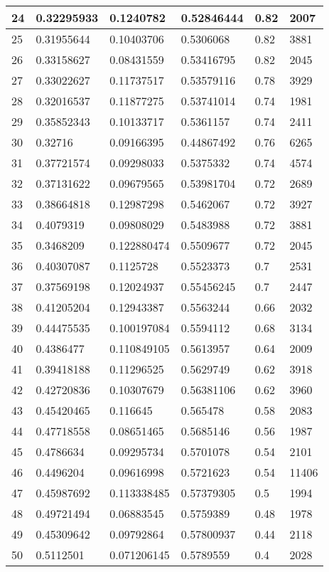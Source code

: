 \begin{longtable}{|l|l|l|l|l|l|}
24 & 0.32295933 & 0.1240782 & 0.52846444 & 0.82 & 2007 \\ \hline 
25 & 0.31955644 & 0.10403706 & 0.5306068 & 0.82 & 3881 \\ \hline 
26 & 0.33158627 & 0.08431559 & 0.53416795 & 0.82 & 2045 \\ \hline 
27 & 0.33022627 & 0.11737517 & 0.53579116 & 0.78 & 3929 \\ \hline 
28 & 0.32016537 & 0.11877275 & 0.53741014 & 0.74 & 1981 \\ \hline 
29 & 0.35852343 & 0.10133717 & 0.5361157 & 0.74 & 2411 \\ \hline 
30 & 0.32716 & 0.09166395 & 0.44867492 & 0.76 & 6265 \\ \hline 
31 & 0.37721574 & 0.09298033 & 0.5375332 & 0.74 & 4574 \\ \hline 
32 & 0.37131622 & 0.09679565 & 0.53981704 & 0.72 & 2689 \\ \hline 
33 & 0.38664818 & 0.12987298 & 0.5462067 & 0.72 & 3927 \\ \hline 
34 & 0.4079319 & 0.09808029 & 0.5483988 & 0.72 & 3881 \\ \hline 
35 & 0.3468209 & 0.122880474 & 0.5509677 & 0.72 & 2045 \\ \hline 
36 & 0.40307087 & 0.1125728 & 0.5523373 & 0.7 & 2531 \\ \hline 
37 & 0.37569198 & 0.12024937 & 0.55456245 & 0.7 & 2447 \\ \hline 
38 & 0.41205204 & 0.12943387 & 0.5563244 & 0.66 & 2032 \\ \hline 
39 & 0.44475535 & 0.100197084 & 0.5594112 & 0.68 & 3134 \\ \hline 
40 & 0.4386477 & 0.110849105 & 0.5613957 & 0.64 & 2009 \\ \hline 
41 & 0.39418188 & 0.11296525 & 0.5629749 & 0.62 & 3918 \\ \hline 
42 & 0.42720836 & 0.10307679 & 0.56381106 & 0.62 & 3960 \\ \hline 
43 & 0.45420465 & 0.116645 & 0.565478 & 0.58 & 2083 \\ \hline 
44 & 0.47718558 & 0.08651465 & 0.5685146 & 0.56 & 1987 \\ \hline 
45 & 0.4786634 & 0.09295734 & 0.5701078 & 0.54 & 2101 \\ \hline 
46 & 0.4496204 & 0.09616998 & 0.5721623 & 0.54 & 11406 \\ \hline 
47 & 0.45987692 & 0.113338485 & 0.57379305 & 0.5 & 1994 \\ \hline 
48 & 0.49721494 & 0.06883545 & 0.5759389 & 0.48 & 1978 \\ \hline 
49 & 0.45309642 & 0.09792864 & 0.57800937 & 0.44 & 2118 \\ \hline 
50 & 0.5112501 & 0.071206145 & 0.5789559 & 0.4 & 2028 \\ \hline 
\end{longtable}